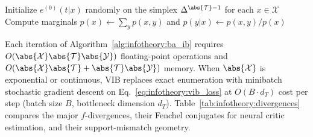 \documentclass[../../../../master.tex]{subfiles}
\begin{document}
\begin{algorithm}[htbp]
\caption{Blahut--Arimoto Iterative Information Bottleneck Solver}
\label{alg:infotheory:ba_ib}
Initialize $e^{(0)}(t|x)$ randomly on the simplex $\Delta^{\abs{\mathcal{T}}-1}$ for each $x \in \mathcal{X}$\;
Compute marginals $p(x) \leftarrow \sum_{y} p(x, y)$ and $p(y|x) \leftarrow p(x, y)/p(x)$\;
\;
\end{algorithm}

Each iteration of Algorithm~\ref{alg:infotheory:ba_ib} requires $O(\abs{\mathcal{X}}\abs{\mathcal{T}}\abs{\mathcal{Y}})$ floating-point operations and $O(\abs{\mathcal{X}}\abs{\mathcal{T}} + \abs{\mathcal{T}}\abs{\mathcal{Y}})$ memory. When $\abs{\mathcal{X}}$ is exponential or continuous, VIB replaces exact enumeration with minibatch stochastic gradient descent on Eq.~\eqref{eq:infotheory:vib_loss} at $O(B \cdot d_T)$ cost per step (batch size $B$, bottleneck dimension $d_T$). Table~\ref{tab:infotheory:divergences} compares the major $f$-divergences, their Fenchel conjugates for neural critic estimation, and their support-mismatch geometry.
\end{document}
